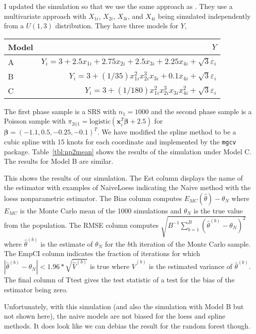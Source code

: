 \documentclass[12pt]{article}
\newcommand{\logistic}{{\text{logistic}}}
\renewcommand{\bf}[1]{\mathbf{#1}}
\begin{document}
I updated the simulation so that we use the same approach as
\cite{wang2023statistical}. They use a multivariate approach with $X_{1i}$,
$X_{2i}$, $X_{3i}$, and $X_{4i}$ being simulated independently from a $U(1, 3)$
distribution. They have three models for $Y$,

\begin{table}[ht!]
\centering
\begin{tabular}{lr}
\toprule
Model & $Y$ \\
\midrule
A & $Y_i = 3 + 2.5 x_{1i} + 2.75 x_{2i} + 2.5 x_{3i} + 2.25 x_{4i} + \sqrt{3} \varepsilon_i$ \\
B & $Y_i = 3 + (1/35) x_{1i}^2 x_{2i}^3 x_{3i} + 0.1 x_{4i} + \sqrt{3} \varepsilon_i$\\
C & $Y_i = 3 + (1/180) x_{1i}^2 x_{2i}^3 x_{3i} x_{4i}^2 + \sqrt{3} \varepsilon_i$ \\ 
\bottomrule
\end{tabular}
\end{table}

The first phase sample is a SRS with $n_1 = 1000$ and the second phase sample is
a Poisson sample with $\pi_{2i|1} = \logistic(\bf x_i^T \bm \beta + 2.5)$ for $\bm
\beta = (-1.1, 0.5, -0.25, -0.1)^T$. We have modified the spline method to be a
cubic spline with 15 knots for each coordinate and implemented by the \texttt{mgcv}
package. Table~\ref{tbl:np2mean} shows the results
of the simulation under Model C. The results for Model B are similar.

\begin{table}[ht!]
  \centering
  
  \caption{This shows the results of our simulation. The Est column displays the
  name of the estimator with examples of NaiveLoess indicating the Naive method
  with the loess nonparametric estimator. The Bias column computes $E_{MC}(\hat
  \theta) - \theta_N$ where $E_{MC}$ is the Monte Carlo mean of the 1000
  simulations and $\theta_N$ is the true value from the population. The RMSE
  column computes $\sqrt{B^{-1}\sum_{b = 1}^B (\hat \theta^{(b)} - \theta_N)^2}$
  where $\hat \theta^{(b)}$ is the estimate of $\theta_N$ for the $b$th
  iteration of the Monte Carlo sample. The EmpCI column indicates the fraction
  of iterations for which $|\hat \theta^{(b)} - \theta_N| < 1.96 * \sqrt{\hat V^{(b)}}$
  is true where $\hat V^{(b)}$ is the estimated variance of $\hat \theta^{(b)}$.
  The final column of Ttest gives the test statistic of a test for the bias of the
  estimator being zero.}
  \label{tbl:np2mean}
\end{table}

Unfortunately, with this simulation (and also the simulation with Model B but
not shown here), the naive models are not biased for the loess and spline
methods. It does look like we can debias the result for the random forest
though.

\newpage 



\end{document}

